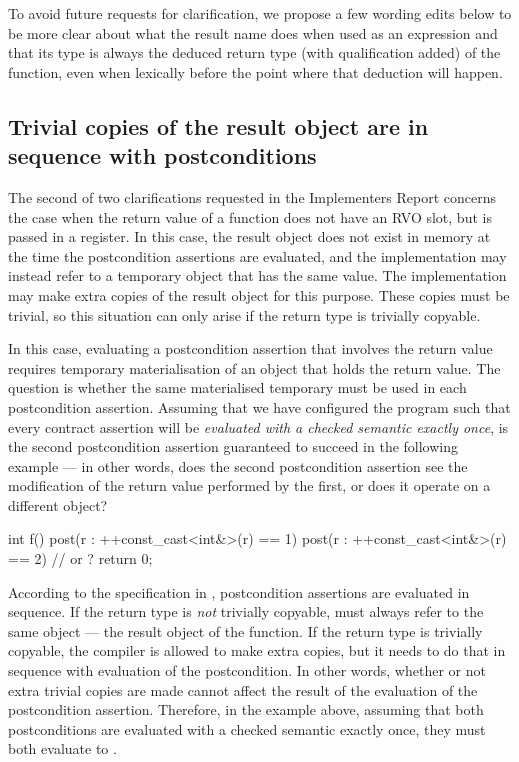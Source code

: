 To avoid future requests for clarification, we propose a few wording edits below to be more clear about what the result name does when used as an expression and that its type is always the deduced return type (with  qualification added) of the function, even when lexically before the point where that deduction will happen.

\subsection{Trivial copies of the result object are in sequence with postconditions}

The second of two clarifications requested in the Implementers Report \cite{P3460R0} concerns the case when the return value of a function does not have an RVO slot, but is passed in a register. In this case, the result object does not exist in memory at the time the postcondition assertions are evaluated, and the implementation may instead refer to a temporary object that has the same value. The implementation may make extra copies of the result object for this purpose. These copies must be trivial, so this situation can only arise if the return type is trivially copyable.

In this case, evaluating a postcondition assertion that involves the return value requires temporary materialisation of an object that holds the return value. The question is whether the same materialised temporary must be used in each postcondition assertion. Assuming that we have configured the program such that every contract assertion will be \emph{evaluated with a checked semantic exactly once}, is the second postcondition assertion guaranteed to succeed in the following example --- in other words, does the second postcondition assertion see the modification of the return value performed by the first, or does it operate on a different object?
\begin{codeblock}
int f()
post(r : ++const_cast<int&>(r) == 1)
post(r : ++const_cast<int&>(r) == 2) {  //  or ?
  return 0; 
}
\end{codeblock}
According to the specification in \cite{P2900R10}, postcondition assertions are evaluated in sequence. If the return type is \emph{not} trivially copyable,  must always refer to the same object --- the result object of the function. If the return type is trivially copyable, the compiler is allowed to make extra copies, but it needs to do that in sequence with evaluation of the postcondition. In other words, whether or not extra trivial copies are made cannot affect the result of the evaluation of the postcondition assertion. Therefore, in the example above, assuming that both postconditions are evaluated with a checked semantic exactly once, they must both evaluate to .

